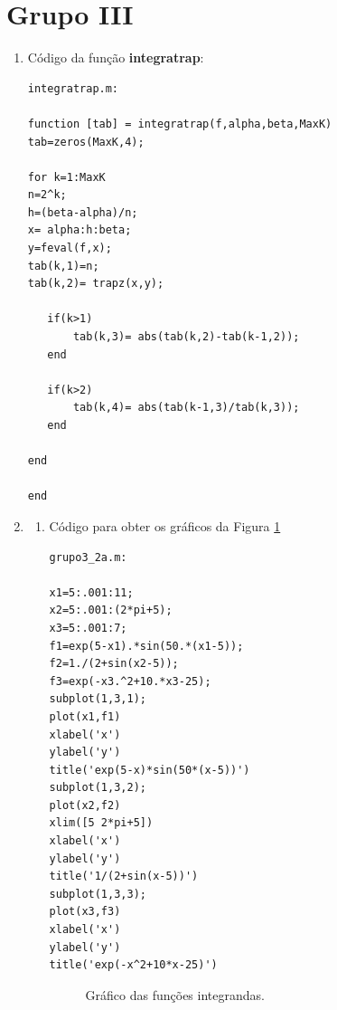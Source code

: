 \documentclass[a4paper,10pt]{extarticle}
\begin{document}
\section*{Grupo III}

\begin{enumerate}
\item Código da função {\bf integratrap}:
{\small
\begin{verbatim}
integratrap.m:

function [tab] = integratrap(f,alpha,beta,MaxK)
tab=zeros(MaxK,4);

for k=1:MaxK
n=2^k;  
h=(beta-alpha)/n;
x= alpha:h:beta;
y=feval(f,x);
tab(k,1)=n;
tab(k,2)= trapz(x,y);

   if(k>1)
       tab(k,3)= abs(tab(k,2)-tab(k-1,2));
   end
   
   if(k>2)
       tab(k,4)= abs(tab(k-1,3)/tab(k,3));
   end
   
end

end

\end{verbatim}
}

\item 
\begin{enumerate}
\item Código para obter os gráficos da Figura \ref{fig:figura-perguntaIIIa}
{\small
\begin{verbatim}
grupo3_2a.m:

x1=5:.001:11;
x2=5:.001:(2*pi+5);
x3=5:.001:7;
f1=exp(5-x1).*sin(50.*(x1-5));
f2=1./(2+sin(x2-5));
f3=exp(-x3.^2+10.*x3-25);
subplot(1,3,1);
plot(x1,f1)
xlabel('x')
ylabel('y')
title('exp(5-x)*sin(50*(x-5))')
subplot(1,3,2);
plot(x2,f2)
xlim([5 2*pi+5])
xlabel('x')
ylabel('y')
title('1/(2+sin(x-5))')
subplot(1,3,3);
plot(x3,f3)
xlabel('x')
ylabel('y')
title('exp(-x^2+10*x-25)')

\end{verbatim}
}
\begin{figure}[htb]
\centerline{ }
\caption{Gráfico das funções integrandas.}
\label{fig:figura-perguntaIIIa}
\end{figure}


\end{enumerate}
\end{enumerate}
\end{document}
